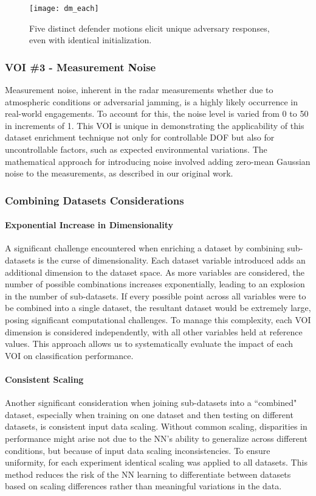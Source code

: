 \documentclass[journal]{IEEEtran} %
\begin{document}
\begin{figure}[h]
    \centering
    \texttt{[image: dm\_each]}
    \caption{Five distinct defender motions elicit unique adversary responses, even with identical  initialization.}
    \label{fig:dm_each}
\end{figure}


\subsubsection{VOI \#3 - Measurement Noise}
Measurement noise, inherent in the radar measurements whether due to atmospheric conditions or adversarial jamming, is a highly likely occurrence in real-world engagements. To account for this, the noise level is varied from 0 to 50 in increments of 1. This VOI is unique in demonstrating the applicability of this dataset enrichment technique not only for controllable DOF but also for uncontrollable factors, such as expected environmental variations. The mathematical approach for introducing noise involved adding zero-mean Gaussian noise to the measurements, as described in our original work.


\subsubsection{Combining Datasets Considerations}
\paragraph{Exponential Increase in Dimensionality}
A significant challenge encountered when enriching a dataset by combining sub-datasets is the curse of dimensionality. Each dataset variable introduced adds an additional dimension to the dataset space. As more variables are considered, the number of possible combinations increases exponentially, leading to an explosion in the number of sub-datasets. If every possible point across all variables were to be combined into a single dataset, the resultant dataset would be extremely large, posing significant computational challenges. To manage this complexity, each VOI dimension is considered independently, with all other variables held at reference values. This approach allows us to systematically evaluate the impact of each VOI on classification performance.
\paragraph{Consistent Scaling}
Another significant consideration when joining sub-datasets into a ``combined" dataset, especially when training on one dataset and then testing on different datasets, is consistent input data scaling. Without common scaling, disparities in performance might arise not due to the NN's ability to generalize across different conditions, but because of input data scaling inconsistencies. To ensure uniformity, for each experiment identical scaling was applied to all datasets. This method reduces the risk of the NN learning to differentiate between datasets based on scaling differences rather than meaningful variations in the data.
\end{document}
